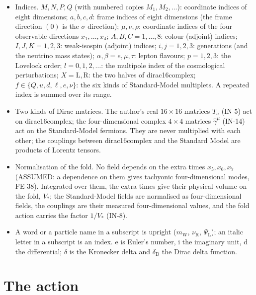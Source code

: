 \documentclass[
  10pt,
]{article}
\providecommand{\tightlist}{%
  \setlength{\itemsep}{0pt}\setlength{\parskip}{0pt}}
\begin{document}
\begin{itemize}
\tightlist
\item
  Indices. \(M, N, P, Q\) (with numbered copies \(M_1, M_2, \dots\)):
  coordinate indices of eight dimensions; \(a, b, c, d\): frame indices
  of eight dimensions (the frame direction \((0)\) is the \(\sigma\)
  direction); \(\mu, \nu, \rho\): coordinate indices of the four
  observable directions \(x_1, \dots, x_4\); \(A, B, C = 1, \dots, 8\):
  colour (adjoint) indices; \(I, J, K = 1, 2, 3\): weak-isospin
  (adjoint) indices; \(i, j = 1, 2, 3\): generations (and the neutrino
  mass states); \(\alpha, \beta = e, \mu, \tau\): lepton flavours;
  \(p = 1, 2, 3\): the Lovelock order; \(l = 0, 1, 2, \dots\): the
  multipole index of the cosmological perturbations;
  \(X = \mathrm{L}, \mathrm{R}\): the two halves of dirac16complex;
  \(f \in \{Q, u, d, \ell, e, \nu\}\): the six kinds of Standard-Model
  multiplets. A repeated index is summed over its range.
\item
  Two kinds of Dirac matrices. The author's real \(16 \times 16\)
  matrices \(T_a\) (IN-5) act on dirac16complex; the four-dimensional
  complex \(4 \times 4\) matrices \(\hat\gamma^\mu\) (IN-14) act on the
  Standard-Model fermions. They are never multiplied with each other;
  the couplings between dirac16complex and the Standard Model are
  products of Lorentz tensors.
\item
  Normalisation of the fold. No field depends on the extra times
  \(x_5, x_6, x_7\) (ASSUMED: a dependence on them gives tachyonic
  four-dimensional modes, FE-38). Integrated over them, the extra times
  give their physical volume on the fold, \(V_*\); the Standard-Model
  fields are normalised as four-dimensional fields, the couplings are
  their measured four-dimensional values, and the fold action carries
  the factor \(1/V_*\) (IN-8).
\item
  A word or a particle name in a subscript is upright
  (\(m_{\mathrm{W}}\), \(\nu_{\mathrm{R}}\), \(\Psi_{\mathrm{L}}\)); an
  italic letter in a subscript is an index. \(\mathrm{e}\) is Euler's
  number, \(\mathrm{i}\) the imaginary unit, \(\mathrm{d}\) the
  differential; \(\delta\) is the Kronecker delta and
  \(\delta_{\mathrm{D}}\) the Dirac delta function.
\end{itemize}

\hypertarget{the-action}{%
\section{The action}\label{the-action}}
\end{document}
